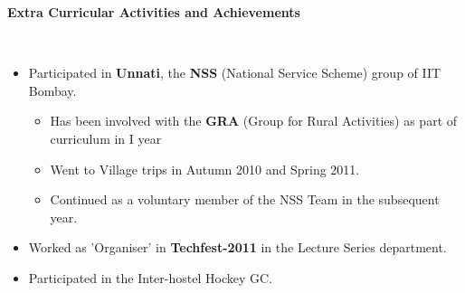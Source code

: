 \documentclass[a4paper,11pt]{article}
\newcommand{\isep}{-2 pt}
\newcommand{\lsep}{-0.5cm}
\newcommand{\resheading}[1]{{\small \colorbox{mygrey}{\begin{minipage}{0.975\textwidth}{\textbf{#1 \vphantom{p\^{E}}}}\end{minipage}}}}
\begin{document}
\resheading{\textbf{\large Extra Curricular Activities and Achievements}}\\[\lsep]
\begin{itemize}\itemsep \isep
  \item Participated in \textbf{Unnati}, the \textbf{NSS} (National Service Scheme) group of IIT Bombay.
	\begin{itemize} 
	 \item Has been involved with the \textbf{GRA} (Group for Rural Activities) as part of curriculum in I year\\[-0.6cm]
	 \item Went to Village trips in Autumn 2010 and Spring 2011.\\[-0.6cm]
	 \item Continued as a voluntary member of the NSS Team in the subsequent year.
	  \end{itemize}
  \item Worked as 'Organiser' in \textbf{Techfest-2011} in the Lecture Series department. \\[-0.6cm]
  \item Participated in the Inter-hostel Hockey GC. 
\end{itemize}
	
\end{document}
